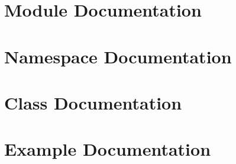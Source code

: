 \documentclass[twoside]{book}
\begin{document}
\chapter{Module Documentation}




\chapter{Namespace Documentation}

\chapter{Class Documentation}

\chapter{Example Documentation}







\newpage
{}
{}
\printindex
\end{document}
